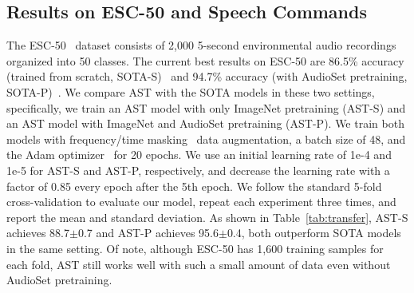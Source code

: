 \documentclass[a4paper]{article}
\begin{document}
\subsection{Results on ESC-50 and Speech Commands}
\label{sec:transfer}
The ESC-50~\cite{piczak2015esc} dataset consists of 2,000 5-second environmental audio recordings organized into 50 classes. The current best results on ESC-50 are 86.5\% accuracy (trained from scratch, SOTA-S)~\cite{sailor2017unsupervised} and 94.7\% accuracy (with AudioSet pretraining, SOTA-P)~\cite{kong2020panns}. We compare AST with the SOTA models in these two settings, specifically, we train an AST model with only ImageNet pretraining (AST-S) and an AST model with ImageNet and AudioSet pretraining (AST-P). We train both models with frequency/time masking~\cite{park2019specaugment} data augmentation, a batch size of 48, and the Adam optimizer~\cite{kingma2015adam} for 20 epochs. We use an initial learning rate of 1e-4 and 1e-5 for AST-S and AST-P, respectively, and decrease the learning rate with a factor of 0.85 every epoch after the 5th epoch. We follow the standard 5-fold cross-validation to evaluate our model, repeat each experiment three times, and report the mean and standard deviation. As shown in Table~\ref{tab:transfer}, AST-S achieves 88.7$\pm$0.7 and AST-P achieves 95.6$\pm$0.4, both outperform SOTA models in the same setting. Of note, although ESC-50 has 1,600 training samples for each fold, AST still works well with such a small amount of data even without AudioSet pretraining.
\end{document}
